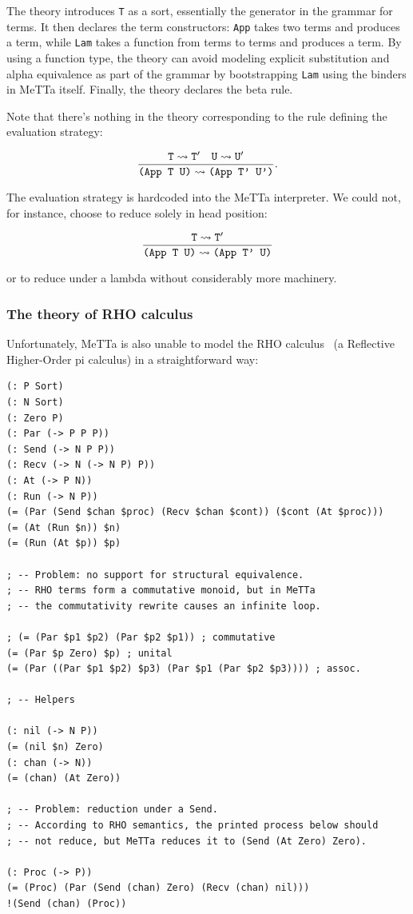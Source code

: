 \documentclass{article}
\begin{document}
The theory introduces \verb+T+ as a sort, essentially the generator in the grammar for terms.  It then declares the term constructors: \verb+App+ takes two terms and produces a term, while \verb+Lam+ takes a function from terms to terms and produces a term.  By using a function type, the theory can avoid modeling explicit substitution and alpha equivalence as part of the grammar by bootstrapping \verb+Lam+ using the binders in MeTTa itself.  Finally, the theory declares the beta rule.

Note that there's nothing in the theory corresponding to the rule defining the evaluation strategy:

\[ \frac{{\tt T} \leadsto {\tt T'} \quad {\tt U} \leadsto {\tt U'}}{\mbox{\tt (App T U)} \leadsto \mbox{\tt (App T' U')}}. \]

The evaluation strategy is hardcoded into the MeTTa interpreter.  We could not, for instance, choose to reduce solely in head position:

\[ \frac{{\tt T} \leadsto {\tt T'}}{\mbox{\tt (App T U)} \leadsto \mbox{\tt (App T' U)}} \]

or to reduce under a lambda without considerably more machinery.

\subsubsection{The theory of RHO calculus}

Unfortunately, MeTTa is also unable to model the RHO calculus~\cite{MeredithRadestock2005} (a Reflective Higher-Order pi calculus) in a straightforward way:

\begin{verbatim}
(: P Sort)
(: N Sort)
(: Zero P)
(: Par (-> P P P))
(: Send (-> N P P))
(: Recv (-> N (-> N P) P))
(: At (-> P N))
(: Run (-> N P))
(= (Par (Send $chan $proc) (Recv $chan $cont)) ($cont (At $proc)))
(= (At (Run $n)) $n)
(= (Run (At $p)) $p)

; -- Problem: no support for structural equivalence.
; -- RHO terms form a commutative monoid, but in MeTTa
; -- the commutativity rewrite causes an infinite loop.

; (= (Par $p1 $p2) (Par $p2 $p1)) ; commutative
(= (Par $p Zero) $p) ; unital
(= (Par ((Par $p1 $p2) $p3) (Par $p1 (Par $p2 $p3)))) ; assoc.

; -- Helpers

(: nil (-> N P))
(= (nil $n) Zero)
(: chan (-> N))
(= (chan) (At Zero))

; -- Problem: reduction under a Send.
; -- According to RHO semantics, the printed process below should
; -- not reduce, but MeTTa reduces it to (Send (At Zero) Zero).

(: Proc (-> P))
(= (Proc) (Par (Send (chan) Zero) (Recv (chan) nil)))
!(Send (chan) (Proc))
\end{verbatim}
\end{document}
